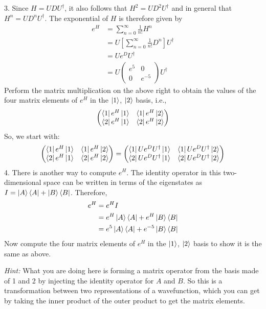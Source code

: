 \documentclass{article}
\begin{document}
\subsection{}
3. Since \( H = UDU^{\dagger} \), it also follows that \( H^2 = UD^2U^{\dagger} \) and in general that \( H^n = UD^nU^{\dagger} \). The exponential of \( H \) is therefore given by
\begin{align*}
e^H &= \sum_{n=0}^{\infty} \frac{1}{n!} H^n \\
&= U \left[ \sum_{n=0}^{\infty} \frac{1}{n!} D^n \right] U^{\dagger} \\
&= U e^D U^{\dagger} \\
&= U 
\begin{pmatrix}
e^5 & 0 \\
0 & e^{-5}
\end{pmatrix}
U^{\dagger}
\end{align*}
Perform the matrix multiplication on the above right to obtain the values of the four matrix elements of \( e^H \) in the \( \ket{1} \), \( \ket{2} \) basis, i.e.,
\[
\begin{pmatrix}
\bra{1}e^H\ket{1} & \bra{1}e^H\ket{2} \\
\bra{2}e^H\ket{1} & \bra{2}e^H\ket{2}
\end{pmatrix}
\]
So, we start with:
\begin{equation}
    \begin{pmatrix}
\bra{1}e^H\ket{1} & \bra{1}e^H\ket{2} \\
\bra{2}e^H\ket{1} & \bra{2}e^H\ket{2}
\end{pmatrix}
=
    \begin{pmatrix}
\bra{1}Ue^DU^{\dagger}\ket{1} & \bra{1}Ue^DU^{\dagger}\ket{2} \\
\bra{2}Ue^DU^{\dagger}\ket{1} & \bra{2}Ue^DU^{\dagger}\ket{2}
\end{pmatrix}
\end{equation}
4. There is another way to compute \( e^H \). The identity operator in this two-dimensional space can be written in terms of the eigenstates as \( I = \ket{A}\bra{A} + \ket{B}\bra{B} \). Therefore,
\begin{align*}
e^H &= e^H I \\
&= e^H\ket{A}\bra{A} + e^H\ket{B}\bra{B} \\
&= e^5\ket{A}\bra{A} + e^{-5}\ket{B}\bra{B}
\end{align*}
Now compute the four matrix elements of \( e^H \) in the \( \ket{1} \), \( \ket{2} \) basis to show it is the same as above. 

\textit{Hint:} What you are doing here is forming a matrix operator from the basis made of 1 and 2 by injecting the identity operator for \( A \) and \( B \). So this is a transformation between two representations of a wavefunction, which you can get by taking the inner product of the outer product to get the matrix elements.



\end{document}
